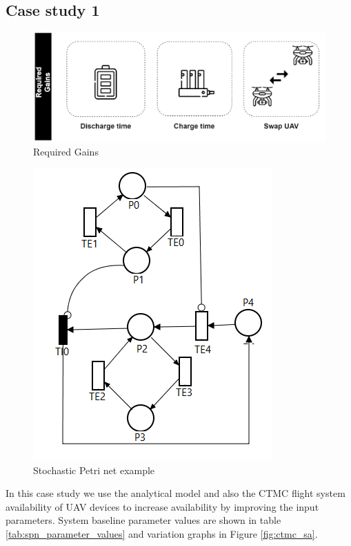 \documentclass[conference]{IEEEtran}
\begin{document}
\subsection{Case study 1}\label{sec:case_studies_sub01}

\begin{figure}[htbp]
\centerline{\includegraphics[scale=0.2]{img/operating_model_study_01.png}}
\caption{Required Gains}
\label{fig:case_study_01}
\end{figure}

\begin{figure}[htbp]
\centerline{\includegraphics[scale=0.75]{img/cold-standby-example.png}}
\caption{Stochastic Petri net example}
\label{fig:stochastic_petri_net_example}
\end{figure}

In this case study we use the analytical model and also the CTMC flight system availability of UAV devices to increase availability by improving the input parameters. System baseline parameter values are shown in table \ref{tab:spn_parameter_values} and variation graphs in Figure \ref{fig:ctmc_sa}.
\end{document}
